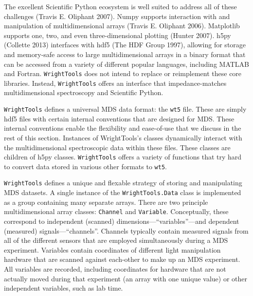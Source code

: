 The excellent Scientific Python ecosystem is well suited to address all
of these challenges (Travis E. Oliphant 2007). Numpy supports
interaction with and manipulation of multidimensional arrays (Travis E.
Oliphant 2006). Matplotlib supports one, two, and even three-dimensional
plotting (Hunter 2007). h5py (Collette 2013) interfaces with hdf5 (The
HDF Group 1997), allowing for storage and memory-safe access to large
multidimensional arrays in a binary format that can be accessed from a
variety of different popular languages, including MATLAB and Fortran.
\texttt{WrightTools} does not intend to replace or reimplement these
core libraries. Instead, \texttt{WrightTools} offers an interface that
impedance-matches multidimensional spectroscopy and Scientific Python.

\texttt{WrightTools} defines a universal MDS data format: the
\texttt{wt5} file. These are simply hdf5 files with certain internal
conventions that are designed for MDS. These internal conventions enable
the flexibility and ease-of-use that we discuss in the rest of this
section. Instances of WrightTools's classes dynamically interact with
the multidimensional spectroscopic data within these files. These
classes are children of h5py classes. \texttt{WrightTools} offers a
variety of functions that try hard to convert data stored in various
other formats to \texttt{wt5}.

\texttt{WrightTools} defines a unique and flexable strategy of storing
and manipulating MDS datasets. A single instance of the
\texttt{WrightTools.Data} class is implemented as a group containing
many separate arrays. There are two principle multidimensional array
classes: \texttt{Channel} and \texttt{Variable}. Conceptually, these
correspond to independent (scanned) dimensions---``variables''---and
dependent (measured) signals---``channels''. Channels typically contain
measured signals from all of the different sensors that are employed
simultaneously during a MDS experiment. Variables contain coordinates of
different light manipulation hardware that are scanned against
each-other to make up an MDS experiment. All variables are recorded,
including coordinates for hardware that are not actually moved during
that experiment (an array with one unique value) or other independent
variables, such as lab time.

